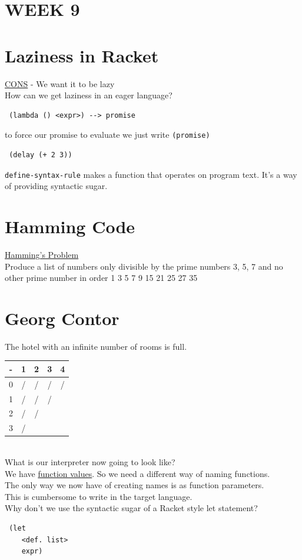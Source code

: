 \documentclass{article}
\begin{document}
\begin{flushleft}
 \section*{WEEK 9}
 \section*{Laziness in Racket}
\begin{flushleft}
\underline{CONS} - We want it to be lazy\\
How can we get laziness in an eager language?\\
\begin{verbatim}
 (lambda () <expr>) --> promise
\end{verbatim}
to force our promise to evaluate we just write \verb|(promise)|\\
\begin{verbatim}
 (delay (+ 2 3))
\end{verbatim}
\verb|define-syntax-rule| makes a function that operates on program text. It's a way of providing syntactic sugar. 
\end{flushleft}

\section*{Hamming Code}
\begin{flushleft}
 \underline{Hamming's Problem}\\
 Produce a list of numbers only divisible by the prime numbers 3, 5, 7 and no other prime number in order 1 3 5 7 9 15 21 25 27 35
\end{flushleft}

\section*{Georg Contor}
\begin{flushleft}
The hotel with an infinite number of rooms is full.\\
\bigskip
\begin{tabular}{c | c c c c}
  - & 1 & 2 & 3 & 4 \\
  \hline
  0 & / & / & / & / \\
  1 & / & / & / &  \\
  2 & / & / &  &  \\
  3 & / &  &  &  \\
\end{tabular}
\bigskip
\\What is our interpreter now going to look like?\\
We have \underline{function values}. So we need a different way of naming functions.\\
The only way we now have of creating names is as function parameters.\\
This is cumbersome to write in the target language.\\
Why don't we use the syntactic sugar of a Racket style let statement?
\pagebreak
\begin{verbatim}
 (let
    <def. list>
    expr)
    

\end{verbatim}
\end{flushleft}
\end{flushleft}
\end{document}

